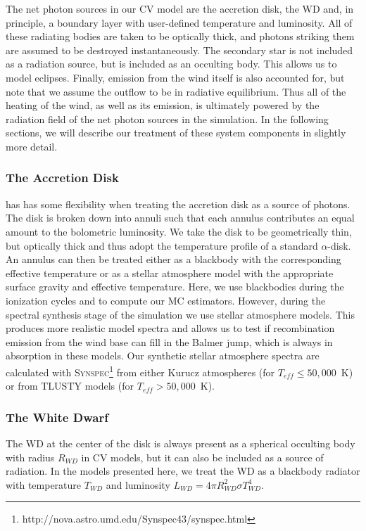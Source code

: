 \documentclass[preprint, a4paper, 11pt]{aastex}
\begin{document}
The net photon sources in our CV model are the accretion disk, the
WD and, in principle, a boundary layer with user-defined temperature
and luminosity. All of these radiating bodies are taken to be
optically thick, and photons striking them are assumed to be destroyed
instantaneously. The secondary star is not included as a radiation
source, but is included as an occulting body. This allows us to model
eclipses. Finally, emission from the wind itself is also accounted for, but
note that we assume the outflow to be in radiative equilibrium. Thus all
of the heating of the wind, as well as its emission, is ultimately
powered by the radiation field of the net photon sources in the
simulation. In the following sections, we will describe our treatment
of these system components in slightly more detail.

\subsubsection{The Accretion Disk}

\py has has some flexibility when treating the accretion 
disk as a source of photons. The disk is broken down into annuli 
such that each annulus contributes an equal amount to the bolometric
luminosity. We take the disk to be geometrically thin, but optically
thick and thus adopt the temperature profile of a standard
\cite{shakurasunyaev1973} $\alpha$-disk. An annulus can then
be treated either as a blackbody with the corresponding effective
temperature or as a stellar atmosphere model with the appropriate
surface gravity and effective temperature. Here, we use blackbodies 
during the ionization cycles and to compute our MC
estimators. However, during the spectral synthesis stage of the 
simulation we use stellar atmosphere models. This produces more
realistic model spectra and allows us to test if recombination
emission from the wind base can fill in the Balmer jump, which is
always in absorption in these models. Our synthetic stellar atmosphere
spectra are calculated with
\textsc{Synspec}\footnote{http://nova.astro.umd.edu/Synspec43/synspec.html}
from either Kurucz \citep{kurucz1991} atmospheres (for $T_{eff} \leq
50,000$~K) or from \textsc{TLUSTY} models \citep{tlusty} (for $T_{eff} > 50,000$~K). 

\subsubsection{The White Dwarf}

The WD at the center of the disk is always present as a spherical occulting
body with radius $R_{WD}$ in \py CV models, but it can also be included
as a source of radiation. In the models presented here, we treat the
WD as a blackbody radiator with temperature $T_{WD}$ and luminosity
$L_{WD} = 4\pi R_{WD}^2 \sigma T_{WD}^4$. 
\end{document}
